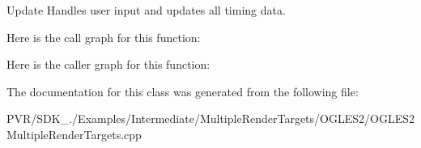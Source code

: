   Update  Handles user input and updates all timing data. 

Here is the call graph for this function\+:




Here is the caller graph for this function\+:




The documentation for this class was generated from the following file\+:\begin{DoxyCompactItemize}
\item 
P\+V\+R/\+S\+D\+K\+\_./\+Examples/\+Intermediate/\+Multiple\+Render\+Targets/\+O\+G\+L\+E\+S2/O\+G\+L\+E\+S2\+Multiple\+Render\+Targets.\+cpp\end{DoxyCompactItemize}

